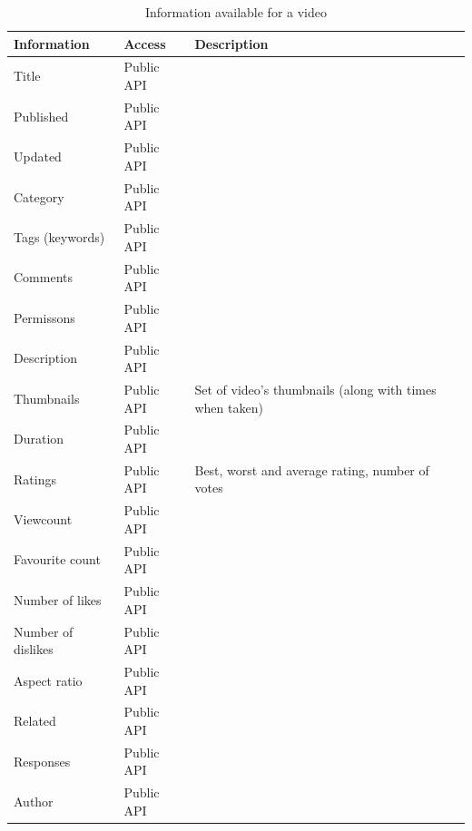 \documentclass{article}
\begin{document}
\begin{table}[ht]
\begin{tabular}{|p{3cm} | l | p{4cm}|}\hline
Information & Access & Description\\ \hline

Title & Public API & \\
Published & Public API & \\
Updated & Public API & \\
Category & Public API & \\
Tags (keywords) & Public API & \\
Comments & Public API & \\
Permissons & Public API & \\
Description & Public API & \\
Thumbnails & Public API & Set of video's thumbnails (along with times
when taken) \\
Duration & Public API & \\
Ratings & Public API & Best, worst and average rating, number of votes
\\
Viewcount & Public API & \\
Favourite count & Public API & \\
Number of likes & Public API & \\
Number of dislikes & Public API & \\
Aspect ratio & Public API & \\
Related & Public API & \\
Responses & Public API & \\
Author & Public API & \\ \hline
\end{tabular}
\caption{Information available for a video}
\end{table}
\end{document}
